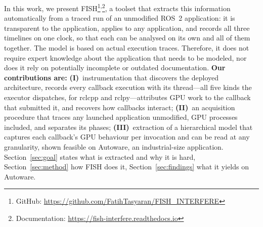 In this work, we present FISH\footnote{GitHub: \url{https://github.com/FatihTasyaran/FISH_INTERFERE}}\textsuperscript{,}\footnote{Documentation: \url{https://fish-interfere.readthedocs.io}}, a toolset that extracts this information automatically from a traced run of an unmodified ROS~2 application: it is transparent to the application, applies to any application, and records all three timelines on one clock, so that each can be analysed on its own and all of them together. The model is based on actual execution traces. Therefore, it does not require expert knowledge about the application that needs to be modeled, nor does it rely on potentially incomplete or outdated documentation. \textbf{Our contributions are:} \textbf{(I)}~instrumentation that discovers the deployed architecture, records every callback execution with its thread---all five kinds the executor dispatches, for rclcpp and rclpy---attributes GPU work to the callback that submitted it, and recovers how callbacks interact; \textbf{(II)}~an acquisition procedure that traces any launched application unmodified, GPU processes included, and separates its phases; \textbf{(III)}~extraction of a hierarchical model that captures each callback's GPU behaviour per invocation and can be read at any granularity, shown feasible on Autoware, an industrial-size application. Section~\ref{sec:goal} states what is extracted and why it is hard, Section~\ref{sec:method} how FISH does it, Section~\ref{sec:findings} what it yields on Autoware.

